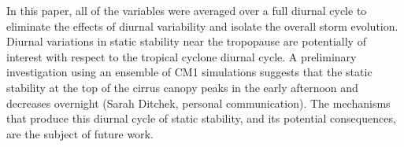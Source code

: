 \documentclass{ametsoc}
\begin{document}


In this paper, all of the variables were averaged over a full diurnal cycle to eliminate the effects of diurnal variability and isolate the overall storm evolution.
Diurnal variations in static stability near the tropopause are potentially of interest with respect to the tropical cyclone diurnal cycle.
A preliminary investigation using an ensemble of CM1 simulations suggests that the static stability at the top of the cirrus canopy peaks in the early afternoon and decreases overnight (Sarah Ditchek, personal communication).
The mechanisms that produce this diurnal cycle of static stability, and its potential consequences, are the subject of future work.



\end{document}
